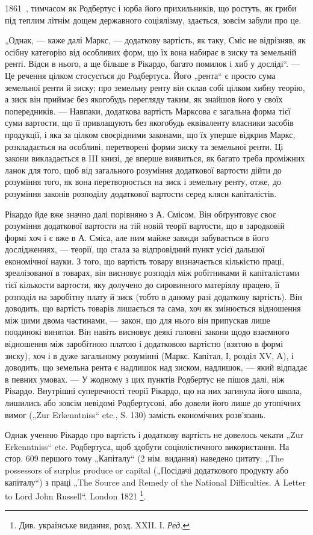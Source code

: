 \parcont{}  %
1861~, тимчасом як Родбертус і юрба його прихильників, що ростуть,
як гриби під теплим літнім дощем державного соціялізму, здається, зовсім
забули про це.

„Однак, — каже далі Маркс, — додаткову вартість, як таку, Сміс не
відрізняв, як осібну категорію від особливих форм, що їх вона набирає
в зиску та земельній ренті. Відси в нього, а ще більше в Рікардо, багато
помилок і хиб у досліді“. — Це речення цілком стосується до Родбертуса.
Його „рента“ є просто сума земельної ренти й зиску; про земельну
ренту він склав собі цілком хибну теорію, а зиск він приймає без якогобудь
перегляду таким, як знайшов його у своїх попередників. — Навпаки,
додаткова вартість Марксова є загальна форма тієї суми вартости, що
її привлащують без якогобудь еквіваленту власники засобів продукції,
і яка за цілком своєрідними законами, що їх уперше відкрив Маркс,
розкладається на особливі, перетворені форми зиску та земельної ренти.
Ці закони викладається в III книзі, де вперше виявиться, як багато треба
проміжних ланок для того, щоб від загального розуміння додаткової
вартости дійти до розуміння того, як вона перетворюється на зиск і
земельну ренту, отже, до розуміння законів розподілу додаткової вартости
серед кляси капіталістів.

Рікардо йде вже значно далі порівняно з А. Смісом. Він обґрунтовує
своє розуміння додаткової вартости на тій новій теорії вартости, що в
зародковій формі хоч і є вже в А. Сміса, але ним майже завжди забувається
в його дослідженнях, — теорії, що стала за відпровідний пункт
усієї дальшої економічної науки. З того, що вартість товару визначається
кількістю праці, зреалізованої в товарах, він висновує розподіл між
робітниками й капіталістами тієї кількости вартости, яку долучено до
сировинного матеріялу працею, її розподіл на заробітну плату й зиск
(тобто в даному разі додаткову вартість). Він доводить, що вартість
товарів лишається та сама, хоч як змінюється відношення між цими двома
частинами, — закон, що для нього він припускав лише поодинокі винятки.
Він навіть висновує деякі головні закони щодо взаємного відношення між
заробітною платою і додатковою вартістю (взятою в формі зиску), хоч і в
дуже загальному розумінні (Маркс. Капітал, І, розділ XV, А), і доводить, що
земельна рента є надлишок над зиском, надлишок, — який відпадає в певних
умовах. — У жодному з цих пунктів Родбертус не пішов далі, ніж Рікардо.
Внутрішні суперечності теорії Рікардо, що на них загинула його школа, лишились
або зовсім невідомі Родбертусові, або довели його лише до утопічних
вимог („Zur Erkenntniss“ etc., S. 130) замість економічних розв’язань.

Однак ученню Рікардо про вартість і додаткову вартість не довелось
чекати „Zur Erkenntniss“ etc. Родбертуса, щоб здобути соціялістичного
використання. На стор. 609 першого тому „Капіталу“ (2 нім. видання)
наведено цитату: „The possessors of surplus produce or capital („Посідачі
додаткового продукту або капіталу“) з праці „The Source and Remedy of
the National Difficulties. A Letter to Lord John Russell“. London 1821 \footnote*{
Див. українське видання, розд. XXII. І. \emph{Ред.}
}.
\parbreak{}  %
